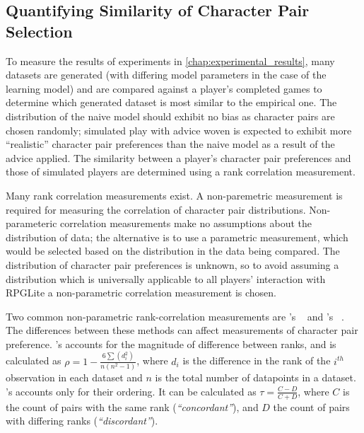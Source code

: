 \subsection{Quantifying Similarity of Character Pair Selection}
\label{measuring_charpair_similarity}

To measure the results of experiments in \cref{chap:experimental_results}, many
datasets are generated (with differing model parameters in the case of the
learning model) and are compared against a player's completed games to determine
which generated dataset is most similar to the empirical one. The distribution
of the naive model should exhibit no bias as character pairs are chosen
randomly; simulated play with advice woven is expected to exhibit more
``realistic'' character pair preferences than the naive model as a result of the
advice applied. The similarity between a player's character pair preferences and
those of simulated players are determined using a rank correlation measurement.

Many rank correlation measurements exist. A non-paremetric measurement is
required for measuring the correlation of character pair distributions.
Non-parameteric correlation measurements make no assumptions about the
distribution of data; the alternative is to use a parametric measurement, which
would be selected based on the distribution in the data being compared. The
distribution of character pair preferences is unknown, so to avoid assuming a
distribution which is universally applicable to all players' interaction with
RPGLite a non-parametric correlation measurement is chosen.

Two common non-parametric rank-correlation measurements are
\citeauthor{spearman_rho_measurement_of_association}'s
\rho{}~\cite{spearman_rho_measurement_of_association} and
\citeauthor{kendall_tau_rank_correlation}'s
\tau{}~\cite{kendall_tau_rank_correlation}. The differences between these
methods can affect measurements of character pair preference.
\citeauthor{spearman_rho_measurement_of_association}'s \rho{} accounts for the
magnitude of difference between ranks, and is calculated as $\rho = 1 - \frac{6
\sum (d^{2}_{i})}{n(n^{2}-1)}$, where $d_{i}$ is the difference in the rank
of the $i^{th}$ observation in each dataset and $n$ is the total number of
datapoints in a dataset. \citeauthor{kendall_tau_rank_correlation}'s \tau{}
accounts only for their ordering. It can be calculated as $\tau = \frac{C - D}{C
+ D}$, where $C$ is the count of pairs with the same rank
(\emph{``concordant''}), and $D$ the count of pairs with differing ranks
(\emph{``discordant''}).

